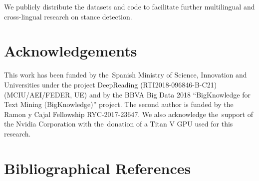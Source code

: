 \documentclass[10pt, a4paper]{article}
\begin{document}
We publicly distribute the datasets and code to facilitate further multilingual and cross-lingual research on stance detection.

\section{Acknowledgements}\label{sec:acknoledgements}

This work has been funded by the~Spanish Ministry of Science, Innovation and Universities under the project DeepReading (RTI2018-096846-B-C21) (MCIU/AEI/FEDER, UE) and by the BBVA Big Data 2018 ``BigKnowledge for Text Mining (BigKnowledge)'' project. The second author is funded by the Ramon y Cajal Fellowship RYC-2017-23647. We also acknowledge the~support of the Nvidia Corporation with the~donation of a Titan V GPU used for this research.

\section{Bibliographical References}\label{main:ref}





\end{document}

